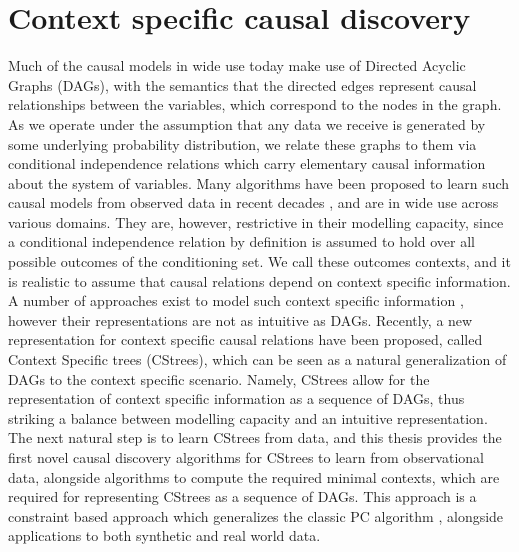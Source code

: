 \documentclass{tufte-book}
\begin{document}
\section{Context specific causal discovery}
\label{sec:org2b3a223}
Much of the causal models in wide use today make use of Directed Acyclic Graphs (DAGs), with the semantics that the directed edges represent causal relationships between the variables, which correspond to the nodes in the graph. As we operate under the assumption that any data we receive is generated by some underlying probability distribution, we relate these graphs to them via conditional independence relations which carry elementary causal information about the system of variables. Many algorithms have been proposed to learn such causal models from observed data in recent decades \cite{chickering-2002-optimal,spirtes-1991-algor-fast,solus-2021-consis-guaran,tsamardinos-2006-max-min-hill}, and are in wide use across various domains. They are, however, restrictive in their modelling capacity, since a conditional independence relation by definition is assumed to hold over all possible outcomes of the conditioning set. We call these outcomes contexts, and it is realistic to assume that causal relations depend on context specific information. A number of approaches exist to model such context specific information \cite{collazo-2018-chain,silander-2013,thwaites-2010-causal-analy,goergen-2017-equiv-class}, however their representations are not as intuitive as DAGs. Recently, a new representation for context specific causal relations have been proposed, called Context Specific trees (CStrees), which can be seen as a natural generalization of DAGs to the context specific scenario. Namely, CStrees allow for the representation of context specific information as a sequence of DAGs, thus striking a balance between modelling capacity and an intuitive representation. The next natural step is to learn CStrees from data, and this thesis provides the first novel causal discovery algorithms for CStrees to learn from observational data, alongside algorithms to compute the required minimal contexts, which are required for representing CStrees as a sequence of DAGs. This approach is a constraint based approach which generalizes the classic PC algorithm \cite{spirtes-1991-algor-fast}, alongside applications to both synthetic and real world data.
\end{document}
